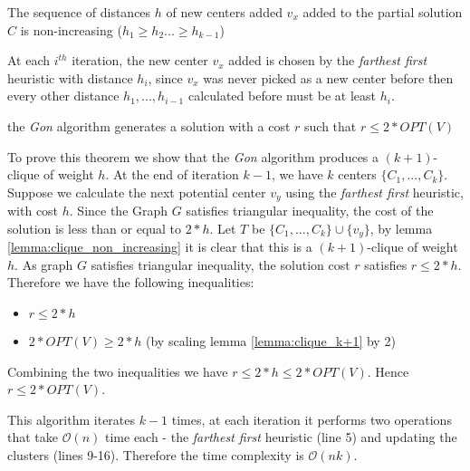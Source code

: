 \begin{lemma}\label{lemma:clique_non_increasing}
The sequence of distances $h$ of new centers added $v_x$ added to the partial solution $C$ is non-increasing ($h_1\geq h_2 ...\geq h_{k-1}$)
\end{lemma}

At each $i^{th}$ iteration, the new center $v_x$ added is chosen by the \emph{farthest first} \gls{heuristic} with distance $h_i$, since $v_x$ was never picked as a new center before then every other distance $h_1,...,h_{i-1}$ calculated before must be at least $h_i$.

\begin{theorem} 
the \emph{Gon} algorithm generates a solution with a cost $r$ such that $r\leq 2 * OPT(V)$
\end{theorem}

To prove this theorem we show that the \emph{Gon} algorithm produces a $(k+1)$-clique of weight $h$. At the end of iteration $k-1$, we have $k$ centers $\{C_1, ...,C_k\}$. Suppose we calculate the next potential center $v_y$ using the \emph{farthest first} heuristic, with cost $h$. Since the Graph $G$ satisfies triangular inequality, the cost of the solution is less than or equal to $2*h$. Let $T$ be $\{C_1, ...,C_k\}\cup\{v_y\}$, by lemma \ref{lemma:clique_non_increasing} it is clear that this is a $(k+1)$-clique of weight $h$. As graph $G$ satisfies triangular inequality, the solution cost $r$ satisfies $r\leq 2*h$. Therefore we have the following inequalities:
\begin{itemize}
    \item $r\leq 2*h$
    \item $2 * OPT(V)\geq 2*h$ (by scaling lemma \ref{lemma:clique_k+1} by 2) 
\end{itemize}
Combining the two inequalities we have $r\leq 2*h\leq 2 * OPT(V)$. Hence $r\leq 2 * OPT(V)$.

This algorithm iterates $k-1$ times, at each iteration it performs two operations that take $\mathcal{O}(n)$ time each - the \emph{farthest first} \gls{heuristic} (line 5) and updating the clusters (lines 9-16). Therefore the time complexity is $\mathcal{O}(nk)$.
